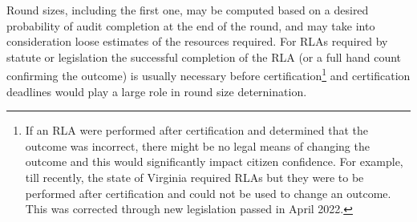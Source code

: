 Round sizes, including the first one, may be computed based on a desired probability of audit completion at the end of the round, and may take into consideration loose estimates of the resources required. For RLAs required by statute or legislation the successful completion of the RLA (or a full hand count confirming the outcome) is usually necessary before certification\footnote{If an RLA were performed after certification and determined that the outcome was incorrect, there might be no legal means of changing the outcome and this would significantly impact citizen confidence. For example, till recently, the state of Virginia required RLAs but they were to be performed after certification and could not be used to change an outcome. This was corrected through new legislation passed in April 2022.} and certification deadlines would play a large role in round size deternination. 



